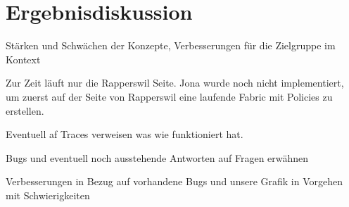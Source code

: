 \section{Ergebnisdiskussion}
Stärken und Schwächen der Konzepte, Verbesserungen für die Zielgruppe im Kontext




Zur Zeit läuft nur die Rapperswil Seite. Jona wurde noch nicht implementiert, um zuerst auf der Seite von Rapperswil eine laufende Fabric mit Policies zu erstellen.

Eventuell af Traces verweisen was wie funktioniert hat.

Bugs und eventuell noch ausstehende Antworten auf Fragen erwähnen

Verbesserungen in Bezug auf vorhandene Bugs und unsere Grafik in Vorgehen mit Schwierigkeiten


